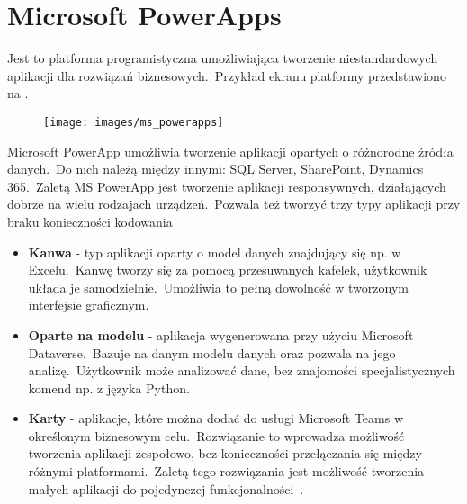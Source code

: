 \section{Microsoft PowerApps}
Jest to platforma programistyczna umożliwiająca tworzenie niestandardowych aplikacji dla rozwiązań biznesowych.\ Przykład ekranu platformy przedstawiono na .

\begin{figure}[H]
    \centering
    \texttt{[image: images/ms\_powerapps]}
    \label{fig:pa-plat}
\end{figure}


Microsoft PowerApp umożliwia tworzenie aplikacji opartych o różnorodne źródła danych.\ Do nich należą między innymi: SQL Server, SharePoint, Dynamics 365.\ Zaletą MS PowerApp jest tworzenie aplikacji responsywnych, działających dobrze na wielu rodzajach urządzeń.\ Pozwala też tworzyć trzy typy aplikacji przy braku konieczności kodowania

\begin{itemize}
    \item \textbf{Kanwa} - typ aplikacji oparty o model danych znajdujący się np. w Excelu.\ Kanwę tworzy się za pomocą przesuwanych kafelek, użytkownik układa je samodzielnie.\ Umożliwia to pełną dowolność w tworzonym interfejsie graficznym.

    \item \textbf{Oparte na modelu} - aplikacja wygenerowana przy użyciu Microsoft Dataverse.\ Bazuje na danym modelu danych oraz pozwala na jego analizę.\ Użytkownik może analizować dane, bez znajomości specjalistycznych komend np. z języka Python.

    \item \textbf{Karty} - aplikacje, które można dodać do usługi Microsoft Teams w określonym biznesowym celu.\ Rozwiązanie to wprowadza możliwość tworzenia aplikacji zespołowo, bez konieczności przełączania się między różnymi platformami.\ Zaletą tego rozwiązania jest możliwość tworzenia małych aplikacji do pojedynczej funkcjonalności~\cite{Microsoft,Microsofta, Microsoftb, Microsoftc}.
\end{itemize}

